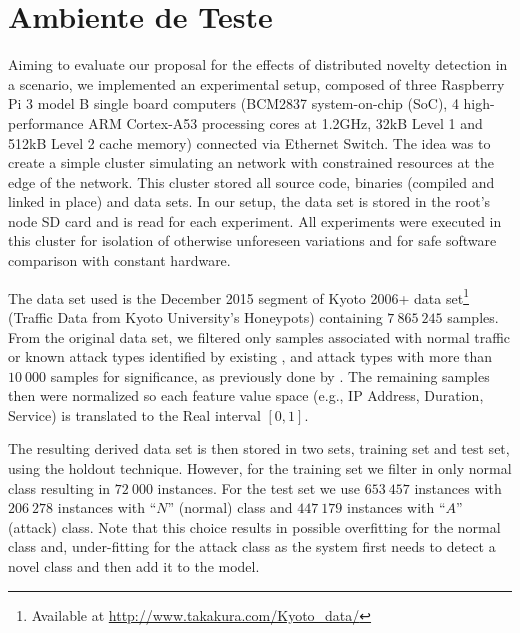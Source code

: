 
\section{Ambiente de Teste}

Aiming to evaluate our proposal for the effects of distributed novelty detection
in a \iot \nids scenario, we implemented an experimental setup, composed of
three 
Raspberry Pi 3 model B single board computers 
(BCM2837 system-on-chip (SoC),
4 high-performance ARM Cortex-A53 processing cores at 1.2GHz,
32kB Level 1 and 512kB Level 2 cache memory)
connected via Ethernet
Switch. The idea was to create a simple cluster simulating an \iot network with
constrained resources at the edge of the network.
This cluster stored all source code, binaries (compiled and linked in place) and
data sets.
In our setup, the data set is stored in the root's node SD card and is read for
each experiment.
All experiments were executed in this cluster for isolation of otherwise
unforeseen variations and for safe software comparison with constant hardware.

The data set used is the December 2015 segment of
Kyoto 2006+ data set\footnote{Available at \url{http://www.takakura.com/Kyoto\_data/}}
(Traffic Data from Kyoto University's Honeypots) \cite{Song2011}
containing $7\:865\:245$ samples.
From the original data set, we filtered only samples associated with normal traffic
or known attack types identified by existing \nids, and attack types with more
than $10\:000$ samples for significance, as previously done by
\cite{Cassales2019a}.
The remaining samples then were normalized so each feature value space (e.g., IP
Address, Duration, Service) is translated to the Real interval $[0, 1]$.

The resulting derived data set is then stored in two sets,
training set and test set, using the holdout technique.
However, for the training set we filter in only normal class
resulting in $72\:000$ instances.
For the test set we use $653\:457$ instances with
$206\:278$ instances with ``$N$'' (normal) class and
$447\:179$ instances with ``$A$'' (attack) class.
Note that this choice results in possible overfitting for the normal class and,
under-fitting for the attack class as the system first needs to detect a novel class and
then add it to the model.

